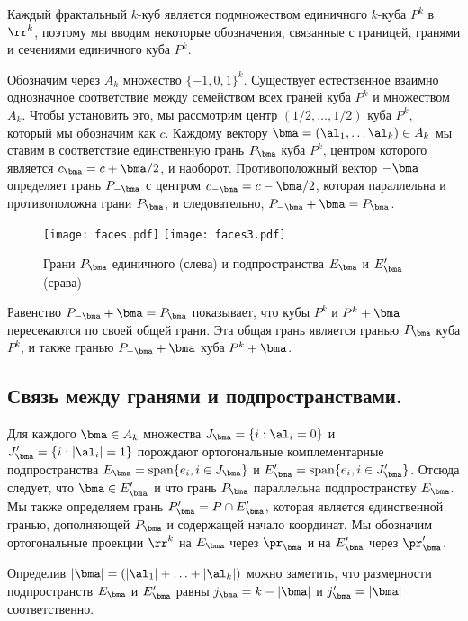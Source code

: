 Каждый фрактальный $k$-куб является подмножеством единичного $k$-куба $P^k$ в $\rr^k$, поэтому мы вводим некоторые обозначения, связанные с границей, гранями и сечениями единичного куба $P^k$.

Обозначим через $A_k$ множество $\{-1,0,1\}^k$. 
Существует естественное взаимно однозначное соответствие между семейством всех граней куба $P^k$ и множеством $A_k$.
Чтобы установить это, мы рассмотрим центр $(1/2,\ldots,1/2)$ куба $P^k$, который мы обозначим как $c$.
Каждому вектору $\bma=(\al_1,\ldots\al_k)\in A_k$ мы ставим в соответствие единственную грань $P_\bma$ куба $P^k$, центром которого является $c_\bma=c+\bma/2$, и наоборот. 
Противоположный вектор $-\bma$ определяет грань $P_{-\bma}$ с центром $c_{-\bma}=c-\bma/2$, которая параллельна и противоположна грани $P_{\bma}$, и следовательно, $P_{-\bma}+\bma=P_\bma$. 

 
\begin{figure}[H]
    \centering
    \texttt{[image: faces.pdf]}
    \hspace{0.05\textwidth}
    \texttt{[image: faces3.pdf]}
    \caption{Грани $P_\bma$ единичного (слева) и подпространства $E_\bma$ и $E'_\bma$ (срава)}
    \label{fig:uq_faces}
\end{figure}

Равенство $P_{-\bma}+\bma=P_\bma$ показывает, что кубы $P^k$ и $P^k+\bma$ пересекаются по своей общей грани. 
Эта общая грань является гранью $P_\bma$ куба $P^k$, и также гранью $P_{-\bma}+\bma$ куба $P^k +\bma$.


\subsection{Связь между гранями и подпространствами.} 

Для каждого $\bma\in A_k$ множества $J_\bma=\{i:\al_i=0\}$ и $J'_\bma=\{i:|\al_i|= 1\}$ порождают ортогональные комплементарные подпространства $E_\bma=\operatorname{span}\{e_i, i\in J_\bma\}$ и $E'_\bma=\operatorname{span}\{e_i, i\in J'_\bma\}$.
Отсюда следует, что $\bma\in E'_\bma$ и что грань $P_\bma$ параллельна подпространству $E_\bma$.
Мы также определяем грань $P'_\bma=P\cap E'_\bma$, которая является единственной гранью, дополняющей $P_\bma$ и содержащей начало координат.
Мы обозначим ортогональные проекции $\rr^k$ на $E_\bma$ через $\pr_{\bma}$ и на $E'_\bma$ через $\pr'_{\bma}$.
 
Определив $|\bma|=(|\al_1|+\ldots +|\al_k|)$ можно заметить, что размерности подпространств $E_\bma$ и $E '_\bma$ равны $j_\bma=k-|\bma|$ и $j_\bma'=|\bma|$ соответственно.
  
